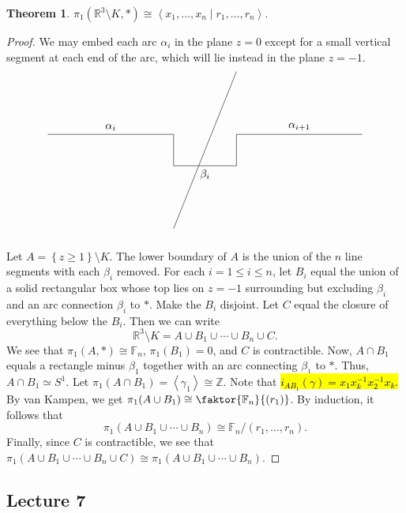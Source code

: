 \documentclass[10pt,letterpaper,cm]{nupset}
\theoremstyle{definition}
\theoremstyle{theorem}
\newtheorem{theorem}[definition]{Theorem}
\theoremstyle{remark}
\newcommand{\R}{\mathbb{R}}
\newcommand{\Z}{\mathbb Z}
\newcommand{\1}{\mathbb{1}}
\newcommand{\0}{\vec 0}
\begin{document}
\begin{theorem}
$\pi_1(\R^3 \setminus K, \ast) \cong \left\langle x_1, \ldots, x_n \mid r_1, \ldots, r_n \right\rangle$.
\end{theorem}
\begin{proof}
We may embed each arc $\alpha_i$ in the plane $z=0$ except for a small vertical segment at each end of the arc, which will lie instead in the plane $z={-1}$. 
\[
\begin{tikzpicture}
  \draw (0,1) node (nodeA) [below]  {} -- (4,1) node (nodeB) [above] {} node [midway, above, sloped] (EdgeAB) {$\alpha_i$} -- (4,0) node [below] (nodeC) {} node [midway, above, sloped] (EdgeBC) {} -- (6,0) node [above] (nodeD) {} node [midway, below, sloped] (EdgeCD) {$\beta_i$} -- (6,1) node (nodeE) [below]  {} -- (10,1) node (nodeF) [below]  {} node [midway, above, sloped] (EdgeEF) {$\alpha_{i+1}$} 
(4,-2) node (nodeG) [below]  {} --  (6,3) node (nodeH) [below]  {};
\end{tikzpicture}
\]
Let $A = \left\{z\geq 1 \right\}\setminus K$. 
The lower boundary of $A$ is  the union of the $n$ line segments with each $\beta_i$ removed. For each $i=1\leq i \leq n$, let $B_i$ equal the union of a solid rectangular box whose top lies on $z={-1}$ surrounding but excluding $\beta_i$ and an arc connection $\beta_i$ to $\ast$. Make the $B_i$ disjoint. Let $C$ equal the closure of everything below the $B_i$. 
Then  we can write $$\R^3 \setminus K = A \cup B_1 \cup \cdots \cup B_n \cup C.$$ We see that $\pi_1(A, \ast) \cong \mathbb{F}_n$, $\pi_1(B_1) =0$, and $C$ is contractible. Now, $A \cap B_1$ equals a rectangle minus $\beta_1$ together with an arc connecting $\beta_1$ to $\ast$. Thus, $A \cap B_1 \simeq S^1$. Let $\pi_1(A \cap B_1) = \left\langle \gamma_1 \right\rangle \cong \Z$. Note that \hl{$i_{AB_1}(\gamma) = x_1x_k^{-1}x_2^{-1}x_k$.} By van Kampen, we get $\pi_1(A \cup B_1) \cong \faktor{\mathbb{F}_n}{(r_1)}$. By induction, it follows that $$\pi_1(A \cup B_1 \cup \cdots \cup  B_n) \cong \mathbb{F}_n/\left(r_1, \ldots, r_n\right).$$ Finally, since $C$ is contractible, we see that $\pi_1(A \cup B_1 \cup \cdots \cup  B_n \cup C) \cong \pi_1(A \cup B_1 \cup \cdots \cup  B_n).$
\end{proof}

\subsection{Lecture 7}
\end{document}
